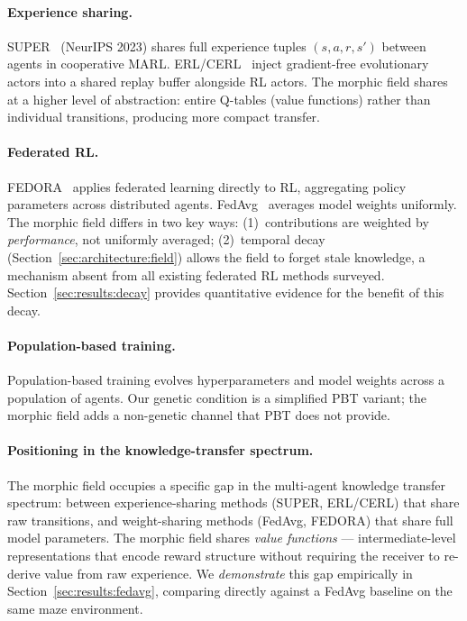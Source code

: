 \documentclass[twoside,11pt]{article}
\begin{document}
\paragraph{Experience sharing.}
SUPER~\citep{gerstgrasser2023} (NeurIPS 2023) shares full experience tuples
$(s, a, r, s')$ between agents in cooperative MARL.  ERL/CERL~\citep{pourchot2019}
inject gradient-free evolutionary actors into a shared replay buffer alongside
RL actors.  The morphic field shares at a higher level of abstraction: entire
Q-tables (value functions) rather than individual transitions, producing more
compact transfer.

\paragraph{Federated RL.}
FEDORA~\citep{che2023} applies federated learning directly to RL, aggregating
policy parameters across distributed agents.  FedAvg~\citep{mcmahan2017}
averages model weights uniformly.  The morphic field differs in two key ways:
(1)~contributions are weighted by \emph{performance}, not uniformly averaged;
(2)~temporal decay (Section~\ref{sec:architecture:field}) allows the field to
forget stale knowledge, a mechanism absent from all existing federated RL methods
surveyed.  Section~\ref{sec:results:decay} provides quantitative evidence for
the benefit of this decay.

\paragraph{Population-based training.}
Population-based training \citep[PBT;][]{jaderberg2017} evolves
hyperparameters and model weights across a population of agents.  Our genetic
condition is a simplified PBT variant; the morphic field adds a
non-genetic channel that PBT does not provide.

\paragraph{Positioning in the knowledge-transfer spectrum.}
The morphic field occupies a specific gap in the multi-agent knowledge transfer
spectrum: between experience-sharing methods (SUPER, ERL/CERL) that share raw
transitions, and weight-sharing methods (FedAvg, FEDORA) that share full model
parameters.  The morphic field shares \emph{value functions} ---
intermediate-level representations that encode reward structure without
requiring the receiver to re-derive value from raw experience.
We \emph{demonstrate} this gap empirically in Section~\ref{sec:results:fedavg},
comparing directly against a FedAvg baseline on the same maze environment.
\end{document}
